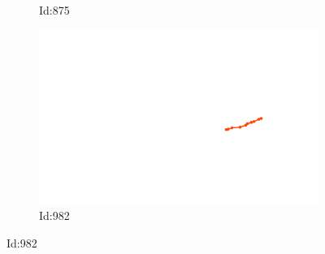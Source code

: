 \documentclass[12pt,twoside]{report}
\begin{document}
\begin{figure}
\begin{subfigure}[b]{0.20\textwidth}
\caption{Id:875}
\end{subfigure}
\begin{subfigure}[b]{0.20\textwidth}
\centering
\includegraphics[width=\textwidth]{../../trajectories/982.png}
\caption{Id:982}
\end{subfigure}
\end{figure}
\end{document}
